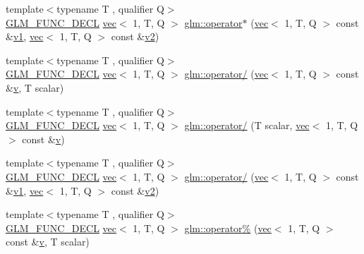 \begin{DoxyCompactItemize}
\item 
{\footnotesize template$<$typename T , qualifier Q$>$ }\\\hyperlink{setup_8hpp_ab2d052de21a70539923e9bcbf6e83a51}{G\+L\+M\+\_\+\+F\+U\+N\+C\+\_\+\+D\+E\+CL} \hyperlink{structglm_1_1vec}{vec}$<$ 1, T, Q $>$ \hyperlink{group__ext__vec1_ga902773a560c5478d0a2c0e5d8343b504}{glm\+::operator$\ast$} (\hyperlink{structglm_1_1vec}{vec}$<$ 1, T, Q $>$ const \&\hyperlink{_s_d_l__opengl__glext_8h_a435c176a02c061b43e19bdf7c86cceae}{v1}, \hyperlink{structglm_1_1vec}{vec}$<$ 1, T, Q $>$ const \&\hyperlink{_s_d_l__opengl__glext_8h_a0928f6d0f0f794ba000a21dfae422136}{v2})
\item 
{\footnotesize template$<$typename T , qualifier Q$>$ }\\\hyperlink{setup_8hpp_ab2d052de21a70539923e9bcbf6e83a51}{G\+L\+M\+\_\+\+F\+U\+N\+C\+\_\+\+D\+E\+CL} \hyperlink{structglm_1_1vec}{vec}$<$ 1, T, Q $>$ \hyperlink{group__ext__vec1_ga5f0627715e89fde4a13b5655961df660}{glm\+::operator/} (\hyperlink{structglm_1_1vec}{vec}$<$ 1, T, Q $>$ const \&\hyperlink{_s_d_l__opengl_8h_a10a82eabcb59d2fcd74acee063775f90}{v}, T scalar)
\item 
{\footnotesize template$<$typename T , qualifier Q$>$ }\\\hyperlink{setup_8hpp_ab2d052de21a70539923e9bcbf6e83a51}{G\+L\+M\+\_\+\+F\+U\+N\+C\+\_\+\+D\+E\+CL} \hyperlink{structglm_1_1vec}{vec}$<$ 1, T, Q $>$ \hyperlink{group__ext__vec1_ga851316b0b0cb8d83400d192036a1b128}{glm\+::operator/} (T scalar, \hyperlink{structglm_1_1vec}{vec}$<$ 1, T, Q $>$ const \&\hyperlink{_s_d_l__opengl_8h_a10a82eabcb59d2fcd74acee063775f90}{v})
\item 
{\footnotesize template$<$typename T , qualifier Q$>$ }\\\hyperlink{setup_8hpp_ab2d052de21a70539923e9bcbf6e83a51}{G\+L\+M\+\_\+\+F\+U\+N\+C\+\_\+\+D\+E\+CL} \hyperlink{structglm_1_1vec}{vec}$<$ 1, T, Q $>$ \hyperlink{group__ext__vec1_ga1199db3fccd25c9b695894159fa12ac8}{glm\+::operator/} (\hyperlink{structglm_1_1vec}{vec}$<$ 1, T, Q $>$ const \&\hyperlink{_s_d_l__opengl__glext_8h_a435c176a02c061b43e19bdf7c86cceae}{v1}, \hyperlink{structglm_1_1vec}{vec}$<$ 1, T, Q $>$ const \&\hyperlink{_s_d_l__opengl__glext_8h_a0928f6d0f0f794ba000a21dfae422136}{v2})
\item 
{\footnotesize template$<$typename T , qualifier Q$>$ }\\\hyperlink{setup_8hpp_ab2d052de21a70539923e9bcbf6e83a51}{G\+L\+M\+\_\+\+F\+U\+N\+C\+\_\+\+D\+E\+CL} \hyperlink{structglm_1_1vec}{vec}$<$ 1, T, Q $>$ \hyperlink{group__ext__vec1_gac7110fb284669c629075b3ab29ad9b4f}{glm\+::operator\%} (\hyperlink{structglm_1_1vec}{vec}$<$ 1, T, Q $>$ const \&\hyperlink{_s_d_l__opengl_8h_a10a82eabcb59d2fcd74acee063775f90}{v}, T scalar)

\end{DoxyCompactItemize}
